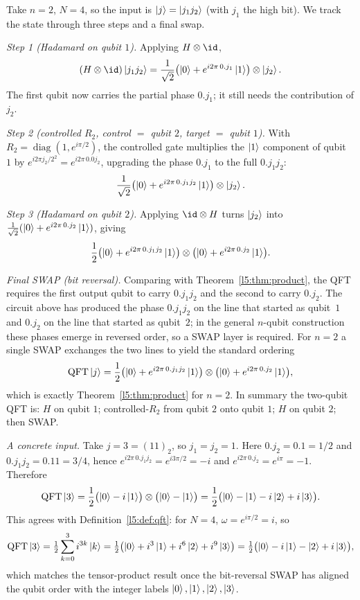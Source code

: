 \begin{example}[The $n=2$ QFT circuit, worked in full]\label{l5:ex:n2}
Take $n=2$, $N=4$, so the input is $\ket{j} = \ket{j_1 j_2}$ (with $j_1$ the
high bit). We track the state through three steps and a final swap.

\emph{Step 1 (Hadamard on qubit $1$).} Applying $H\otimes\id$,
\[
  (H\otimes \id)\ket{j_1 j_2}
   = \frac{1}{\sqrt2}\bigl(\ket{0}+e^{i2\pi\,0.j_1}\ket{1}\bigr)\otimes\ket{j_2}.
\]
The first qubit now carries the partial phase $0.j_1$; it still needs the
contribution of $j_2$.

\emph{Step 2 (controlled $R_2$, control $=$ qubit $2$, target $=$ qubit $1$).}
With $R_2 = \operatorname{diag}(1, e^{i\pi/2})$, the controlled gate multiplies
the $\ket{1}$ component of qubit~$1$ by $e^{i2\pi j_2/2^{2}} = e^{i2\pi\,0.0 j_2}$,
upgrading the phase $0.j_1$ to the full $0.j_1 j_2$:
\[
   \frac{1}{\sqrt2}\bigl(\ket{0}+e^{i2\pi\,0.j_1 j_2}\ket{1}\bigr)\otimes\ket{j_2}.
\]

\emph{Step 3 (Hadamard on qubit $2$).} Applying $\id\otimes H$ turns
$\ket{j_2}$ into $\tfrac{1}{\sqrt2}(\ket{0}+e^{i2\pi\,0.j_2}\ket{1})$, giving
\[
   \frac{1}{2}
     \bigl(\ket{0}+e^{i2\pi\,0.j_1 j_2}\ket{1}\bigr)\otimes
     \bigl(\ket{0}+e^{i2\pi\,0.j_2}\ket{1}\bigr).
\]

\emph{Final SWAP (bit reversal).} Comparing with Theorem~\ref{l5:thm:product}, the
QFT requires the first output qubit to carry $0.j_1 j_2$ and the second to carry
$0.j_2$. The circuit above has produced the phase $0.j_1 j_2$ on the line that
started as qubit~$1$ and $0.j_2$ on the line that started as qubit~$2$; in the
general $n$-qubit construction these phases emerge in reversed order, so a SWAP
layer is required. For $n=2$ a single SWAP exchanges the two lines to yield the
standard ordering
\[
   \mathrm{QFT}\ket{j}
    = \frac{1}{2}
      \bigl(\ket{0}+e^{i2\pi\,0.j_1 j_2}\ket{1}\bigr)\otimes
      \bigl(\ket{0}+e^{i2\pi\,0.j_2}\ket{1}\bigr),
\]
which is exactly Theorem~\ref{l5:thm:product} for $n=2$. In summary the two-qubit
QFT is: $H$ on qubit $1$; controlled-$R_2$ from qubit $2$ onto qubit $1$; $H$ on
qubit $2$; then SWAP.

\emph{A concrete input.} Take $j = 3 = (11)_2$, so $j_1=j_2=1$. Here
$0.j_2 = 0.1 = 1/2$ and $0.j_1 j_2 = 0.11 = 3/4$, hence
$e^{i2\pi\,0.j_1 j_2} = e^{i 3\pi/2} = -i$ and $e^{i2\pi\,0.j_2} = e^{i\pi} = -1$.
Therefore
\[
  \mathrm{QFT}\ket{3}
   = \frac{1}{2}\bigl(\ket{0}- i\ket{1}\bigr)\otimes\bigl(\ket{0}-\ket{1}\bigr)
   = \frac{1}{2}\bigl(\ket{0}-\ket{1}- i\ket{2}+ i\ket{3}\bigr).
\]
This agrees with Definition~\ref{l5:def:qft}: for $N=4$, $\omega = e^{i\pi/2}=i$,
so
\[
  \mathrm{QFT}\ket{3} = \tfrac12\sum_{k=0}^{3} i^{3k}\ket{k}
   = \tfrac12\bigl(\ket{0}+i^{3}\ket{1}+i^{6}\ket{2}+i^{9}\ket{3}\bigr)
   = \tfrac12\bigl(\ket{0}-i\ket{1}-\ket{2}+i\ket{3}\bigr),
\]
which matches the tensor-product result once the bit-reversal SWAP has aligned
the qubit order with the integer labels $\ket{0},\ket{1},\ket{2},\ket{3}$.
\end{example}

